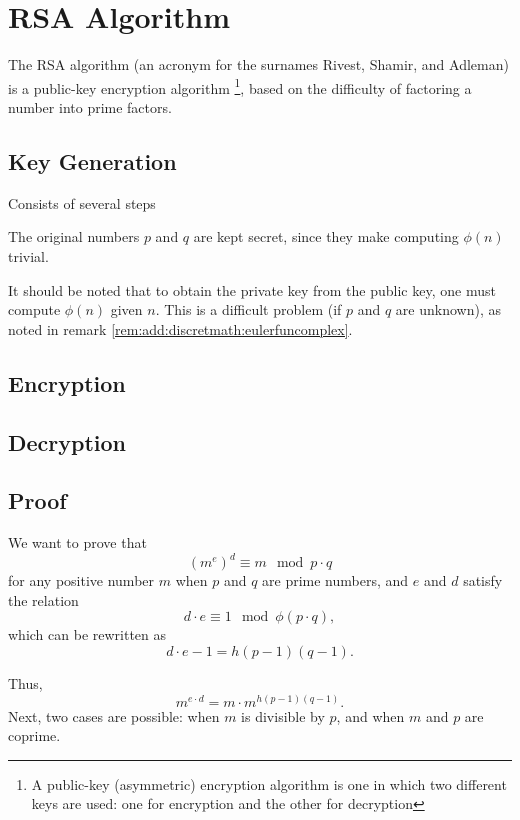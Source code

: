 \section{RSA Algorithm}
\label{AddRSA}
The RSA algorithm (an acronym for the surnames Rivest, Shamir, and Adleman) is a 
public-key encryption algorithm
\footnote{A public-key (asymmetric) encryption algorithm is one in which 
  two different keys are used: one for encryption and the other for decryption},  
based on the difficulty of factoring a number into prime factors.  

\subsection{Key Generation}
Consists of several steps


The original numbers $p$ and $q$ are kept secret, since they make
computing $\phi(n)$ trivial.

It should be noted that to obtain the private key from the public key,
one must compute $\phi(n)$ given $n$. This is a difficult problem (if 
$p$ and $q$ are unknown), as noted in remark
\ref{rem:add:discretmath:eulerfuncomplex}. 



\subsection{Encryption}


\subsection{Decryption}


\subsection{Proof}
We want to prove that 
\[
\left(m^e\right)^d \equiv m \mod{p \cdot q}
\]
for any positive number $m$ when $p$ and $q$ are prime numbers, and $e$
and $d$ satisfy the relation
\[
d \cdot e \equiv 1 \mod{\phi\left(p \cdot q\right)},
\]
which can be rewritten as
\[
d \cdot e - 1 = h \left(p - 1\right)\left(q - 1\right).
\]

Thus,
\[
m^{e \cdot d} = m \cdot m^{h \left(p - 1\right)\left(q - 1\right)}.
\]
Next, two cases are possible: when $m$ is divisible by $p$, and when $m$ and
$p$ are coprime.

